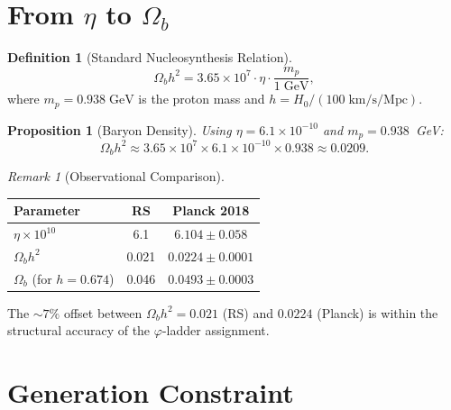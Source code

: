 \documentclass[12pt,a4paper]{article}
\newtheorem{proposition}[theorem]{Proposition}
\theoremstyle{definition}
\newtheorem{definition}[theorem]{Definition}
\theoremstyle{remark}
\newtheorem{remark}[theorem]{Remark}
\begin{document}
\section{From $\eta$ to $\Omega_b$}
\label{sec:omega-b}

\begin{definition}[Standard Nucleosynthesis Relation]
\begin{equation}
  \Omega_b h^2 = 3.65 \times 10^7 \cdot \eta \cdot
  \frac{m_p}{1\;\mathrm{GeV}},
\end{equation}
where $m_p = 0.938\;\mathrm{GeV}$ is the proton mass and
$h = H_0/(100\;\mathrm{km/s/Mpc})$.
\end{definition}

\begin{proposition}[Baryon Density]
\label{thm:omega-b}
Using $\eta = 6.1 \times 10^{-10}$ and $m_p = 0.938$~GeV:
\begin{equation}
  \Omega_b h^2 \approx 3.65 \times 10^7 \times
  6.1 \times 10^{-10} \times 0.938 \approx 0.0209.
\end{equation}
\end{proposition}

\begin{remark}[Observational Comparison]
\begin{center}
\renewcommand{\arraystretch}{1.3}
\begin{tabular}{lcc}
\hline
\textbf{Parameter} & \textbf{RS} & \textbf{Planck 2018} \\
\hline
$\eta \times 10^{10}$ & 6.1 & $6.104 \pm 0.058$ \\
$\Omega_b h^2$ & 0.021 & $0.0224 \pm 0.0001$ \\
$\Omega_b$ (for $h = 0.674$) & 0.046 & $0.0493 \pm 0.0003$ \\
\hline
\end{tabular}
\end{center}
The $\sim 7\%$ offset between $\Omega_b h^2 = 0.021$ (RS) and
$0.0224$ (Planck) is within the structural accuracy of the
$\varphi$-ladder assignment.
\end{remark}

\section{Generation Constraint}
\label{sec:gen-constraint}
\end{document}

